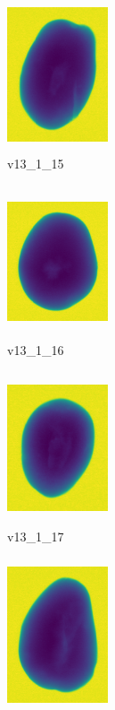 \documentclass[11pt]{article}
\begin{document}
\begin{figure}
     
    \begin{subfigure}[b]{0.15\textwidth}
         \centering
         \includegraphics[width=3cm, height=4.5cm]{images/kartofler/v13_1_15_cut.png}
         \caption{v13\_1\_15}
         \label{fig:y equals x}
     \end{subfigure}
     \hfill
     \begin{subfigure}[b]{0.15\textwidth}
         \centering
         \includegraphics[width=3cm, height=4.5cm]{images/kartofler/v13_1_16_cut.png}
        \caption{v13\_1\_16}
         \label{fig:three sin x}
     \end{subfigure}
     \hfill
     \begin{subfigure}[b]{0.15\textwidth}
         \centering
         \includegraphics[width=3cm, height=4.5cm]{images/kartofler/v13_1_17_cut.png}
        \caption{v13\_1\_17}
         \label{fig:five over x}
     \end{subfigure}
     \hfill
    \begin{subfigure}[b]{0.15\textwidth}
         \centering
         \includegraphics[width=3cm, height=4.5cm]{images/kartofler/v13_1_18_cut.png}

\end{subfigure}
\end{figure}
\end{document}
